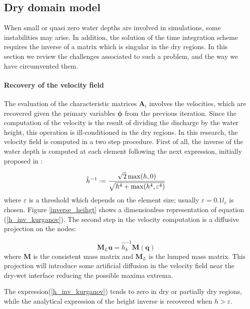 \documentclass[a4paper,12pt]{elsarticle}
\newcommand{\defeq}{\mathrel{\vcenter{\baselineskip0.5ex\lineskiplimit0pt\hbox{\scriptsize.}\hbox{\scriptsize.}}}=}
\begin{document}
\subsection{Dry domain model}

When small or quasi zero water depths are involved in simulations, some instabilities may arise. In addition, the solution of the time integration scheme requires the inverse of a matrix which is singular in the dry regions. In this section we review the challenges associated to such a problem, and the way we have circumvented them.

\paragraph{Recovery of the velocity field}
The evaluation of the characteristic matrices $\mathbf{A}_i$ involves the velocities, which are recovered given the primary variables $\bm{\phi}$ from the previous iteration.
Since the computation of the velocity is the result of dividing
the discharge by the water height, this operation is ill-conditioned in the dry regions. In this research, the velocity field is computed in a two step procedure. First of all, the inverse of the water depth is computed at each element following the next expression, initially proposed in \cite{kurganov2007}:

\begin{equation} \label{h_inv_kurganov}
\hat{h}^{-1} \defeq \frac{\sqrt{2}\max(h,0)}{\sqrt{h^4 + \max(h^4, \varepsilon^4)}}
\end{equation}
where $\varepsilon$ is a threshold which depends on the element size; usually $\varepsilon = 0.1 l_e$ is chosen. Figure \ref{inverse_heihgt} shows a dimensionless representation of equation (\ref{h_inv_kurganov}). The second step in the velocity computation is a diffusive projection on the nodes:

\begin{equation}
\mathbf{M}_L \mathbf{u} = \hat{h}^{-1}_k \mathbf{M} (\mathbf{q})
\end{equation}
where $\mathbf{M}$ is the consistent mass matrix and $\mathbf{M}_L$ is the lumped mass matrix. This projection will introduce some artificial diffusion in the velocity field near the dry-wet interface reducing the possible maxima extrema.

The expression(\ref{h_inv_kurganov}) tends to zero in dry or partially dry regions, while the analytical expression of the height inverse is recovered when $h>\varepsilon$.
\end{document}
